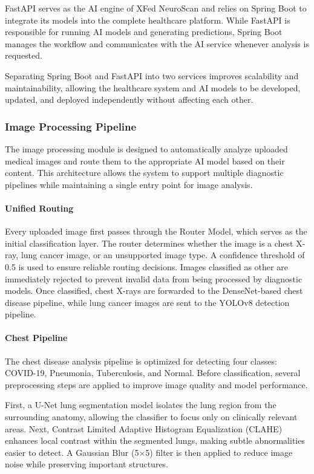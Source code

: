 FastAPI serves as the AI engine of XFed NeuroScan and relies on Spring Boot to integrate its models into the complete healthcare platform. While FastAPI is responsible for running AI models and generating predictions, Spring Boot manages the workflow and communicates with the AI service whenever analysis is requested.

Separating Spring Boot and FastAPI into two services improves scalability and maintainability, allowing the healthcare system and AI models to be developed, updated, and deployed independently without affecting each other.

\subsubsection{Image Processing Pipeline}
The image processing module is designed to automatically analyze uploaded medical images and route them to the appropriate AI model based on their content. This architecture allows the system to support multiple diagnostic pipelines while maintaining a single entry point for image analysis.

\paragraph{Unified Routing}
Every uploaded image first passes through the Router Model, which serves as the initial classification layer. The router determines whether the image is a chest X-ray, lung cancer image, or an unsupported image type. A confidence threshold of 0.5 is used to ensure reliable routing decisions. Images classified as other are immediately rejected to prevent invalid data from being processed by diagnostic models. Once classified, chest X-rays are forwarded to the DenseNet-based chest disease pipeline, while lung cancer images are sent to the YOLOv8 detection pipeline.

\paragraph{Chest Pipeline}
The chest disease analysis pipeline is optimized for detecting four classes: COVID-19, Pneumonia, Tuberculosis, and Normal. Before classification, several preprocessing steps are applied to improve image quality and model performance.

First, a U-Net lung segmentation model isolates the lung region from the surrounding anatomy, allowing the classifier to focus only on clinically relevant areas. Next, Contrast Limited Adaptive Histogram Equalization (CLAHE) enhances local contrast within the segmented lungs, making subtle abnormalities easier to detect. A Gaussian Blur (5×5) filter is then applied to reduce image noise while preserving important structures.


